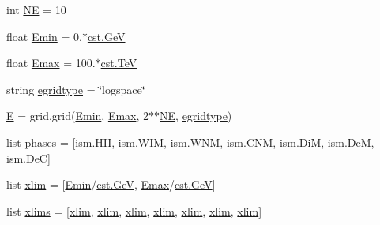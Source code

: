 \begin{DoxyCompactItemize}
\item 
int \hyperlink{namespacedamping__models_a70f7b31459ca4b1018560e17b17b9864}{NE} = 10
\item 
float \hyperlink{namespacedamping__models_acef10a0ab3ea64edbebc04afc529f201}{Emin} = 0.$\ast$\hyperlink{constants_8h_aec0e126d9991db8ad0b26139f5860568}{cst.\+GeV}
\item 
float \hyperlink{namespacedamping__models_a97002a3ccce4531cb0913dad401bb7c8}{Emax} = 100.$\ast$\hyperlink{constants_8h_a7f801e1f6821bc6baf0652ed2496e5e9}{cst.\+TeV}
\item 
string \hyperlink{namespacedamping__models_a4a43583393950d4ac546b8812693c4bc}{egridtype} = \char`\"{}logspace\char`\"{}
\item 
\hyperlink{namespacedamping__models_a2d49832acd95610ad1ef20d532cda813}{E} = grid.\+grid(\hyperlink{namespacedamping__models_acef10a0ab3ea64edbebc04afc529f201}{Emin}, \hyperlink{namespacedamping__models_a97002a3ccce4531cb0913dad401bb7c8}{Emax}, 2$\ast$$\ast$\hyperlink{namespacedamping__models_a70f7b31459ca4b1018560e17b17b9864}{NE}, \hyperlink{namespacedamping__models_a4a43583393950d4ac546b8812693c4bc}{egridtype})
\item 
list \hyperlink{namespacedamping__models_add17c980396e6cf0498d139343c17cd3}{phases} = \mbox{[}ism.\+H\+II, ism.\+W\+IM, ism.\+W\+NM, ism.\+C\+NM, ism.\+DiM, ism.\+DeM, ism.\+DeC\mbox{]}
\item 
list \hyperlink{namespacedamping__models_a8e4dbe05634f505a77dc9337dc5ff680}{xlim} = \mbox{[}\hyperlink{namespacedamping__models_acef10a0ab3ea64edbebc04afc529f201}{Emin}/\hyperlink{constants_8h_aec0e126d9991db8ad0b26139f5860568}{cst.\+GeV}, \hyperlink{namespacedamping__models_a97002a3ccce4531cb0913dad401bb7c8}{Emax}/\hyperlink{constants_8h_aec0e126d9991db8ad0b26139f5860568}{cst.\+GeV}\mbox{]}
\item 
list \hyperlink{namespacedamping__models_abef2252362cdfe34c1df04fa717aa9e0}{xlims} = \mbox{[}\hyperlink{namespacedamping__models_a8e4dbe05634f505a77dc9337dc5ff680}{xlim}, \hyperlink{namespacedamping__models_a8e4dbe05634f505a77dc9337dc5ff680}{xlim}, \hyperlink{namespacedamping__models_a8e4dbe05634f505a77dc9337dc5ff680}{xlim}, \hyperlink{namespacedamping__models_a8e4dbe05634f505a77dc9337dc5ff680}{xlim}, \hyperlink{namespacedamping__models_a8e4dbe05634f505a77dc9337dc5ff680}{xlim}, \hyperlink{namespacedamping__models_a8e4dbe05634f505a77dc9337dc5ff680}{xlim}, \hyperlink{namespacedamping__models_a8e4dbe05634f505a77dc9337dc5ff680}{xlim}\mbox{]}
$$
\end{DoxyCompactItemize}
